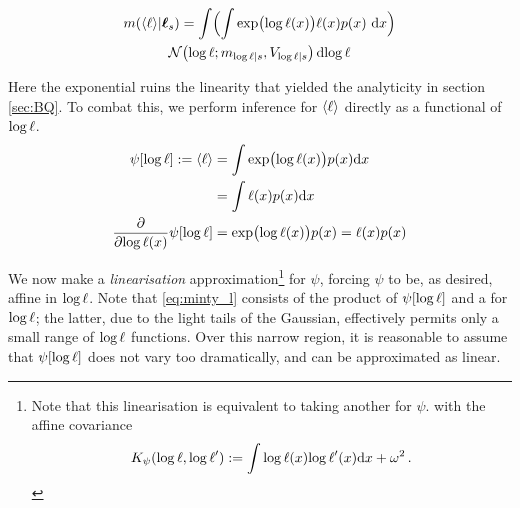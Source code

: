 \documentclass{article}
\begin{document}
%
%
%
\begin{multline}\label{eq:minty_l}
\mean{\inty{\lfn}}{\vr_s}
 =\int \Bigl( \int \exp\bigl(\tr(\lfv)\bigr)\lfn(\lfv)\po{\lfv}\,\ud\lfv\Bigr)\\
\N{\tr}{\meancondfn{\tr}{s}}{\covcondfn{\tr}{s}} \ud \tr
\end{multline}

Here the exponential ruins the linearity that yielded the analyticity in section \ref{sec:BQ}. To combat this, we perform inference for $\inty{\lfn}$ directly as a functional of $\tr$.
%
\begin{align*}
 \psi[\tr] \deq \inty{\lfn} & = \int \exp \bigl( \tr(\lfv)\bigr) p(\lfv) \ud \lfv\\
  						    & = \int \lfn(\lfv) p(\lfv) \ud \lfv\\
\pderiv{}{\tr(\lfv)}\psi[\tr] & = \exp \bigl( \tr(\lfv)\bigr) p(\lfv)  = \lfn(\lfv) p(\lfv) 
\end{align*}

We now make a \emph{linearisation} approximation\footnote{Note that this linearisation is equivalent to taking another \gpb for $\psi$. with the affine covariance
\begin{equation*}
 K_\psi(\tr,\tr')
\deq
\int\tr(\lfv) \tr'(\lfv) \ud \lfv
+ \omega^2\,.
\end{equation*}
} 
for $\psi$, forcing $\psi$ to be, as desired, affine in $\tr$. 
Note that \eqref{eq:minty_l} consists of the product of $\psi[\tr]$ and a \gpb for $\tr$; the latter, due to the light tails of the Gaussian, effectively permits only a small range of $\tr$ functions. Over this narrow region, it is reasonable to assume that $\psi[\tr]$ does not vary too dramatically, and can be approximated as linear. 
\end{document}
